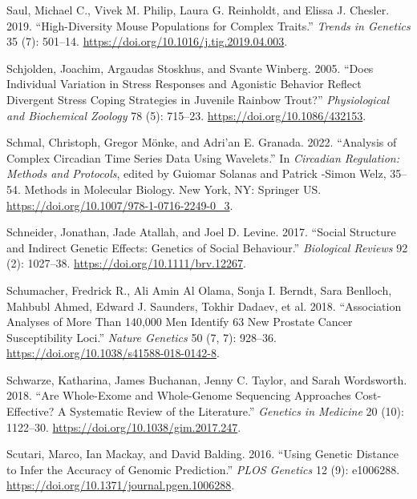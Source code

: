 \documentclass[
]{book}
\newlength{\cslhangindent}
\newlength{\cslentryspacingunit} %
\newenvironment{CSLReferences}[2] %
 {%
  \setlength{\parindent}{0pt}
  \ifodd #1
  \let\oldpar\par
  \def\par{\hangindent=\cslhangindent\oldpar}
  \fi
  \setlength{\parskip}{#2\cslentryspacingunit}
 }%
 {}
\begin{document}
\begin{CSLReferences}{1}{0}
\leavevmode{}%
Saul, Michael C., Vivek M. Philip, Laura G. Reinholdt, and Elissa J. Chesler. 2019. {``High-{Diversity Mouse Populations} for {Complex Traits}.''} \emph{Trends in Genetics} 35 (7): 501--14. \url{https://doi.org/10.1016/j.tig.2019.04.003}.

\leavevmode{}%
Schjolden, Joachim, Argaudas Stoskhus, and Svante Winberg. 2005. {``Does {Individual Variation} in {Stress Responses} and {Agonistic Behavior Reflect Divergent Stress Coping Strategies} in {Juvenile Rainbow Trout}?''} \emph{Physiological and Biochemical Zoology} 78 (5): 715--23. \url{https://doi.org/10.1086/432153}.

\leavevmode{}%
Schmal, Christoph, Gregor Mönke, and Adri'an E. Granada. 2022. {``Analysis of {Complex Circadian Time Series Data Using Wavelets}.''} In \emph{Circadian {Regulation}: {Methods} and {Protocols}}, edited by Guiomar Solanas and Patrick -Simon Welz, 35--54. Methods in {Molecular Biology}. {New York, NY}: {Springer US}. \url{https://doi.org/10.1007/978-1-0716-2249-0_3}.

\leavevmode{}%
Schneider, Jonathan, Jade Atallah, and Joel D. Levine. 2017. {``Social Structure and Indirect Genetic Effects: Genetics of Social Behaviour.''} \emph{Biological Reviews} 92 (2): 1027--38. \url{https://doi.org/10.1111/brv.12267}.

\leavevmode{}%
Schumacher, Fredrick R., Ali Amin Al Olama, Sonja I. Berndt, Sara Benlloch, Mahbubl Ahmed, Edward J. Saunders, Tokhir Dadaev, et al. 2018. {``Association Analyses of More Than 140,000 Men Identify 63 New Prostate Cancer Susceptibility Loci.''} \emph{Nature Genetics} 50 (7, 7): 928--36. \url{https://doi.org/10.1038/s41588-018-0142-8}.

\leavevmode{}%
Schwarze, Katharina, James Buchanan, Jenny C. Taylor, and Sarah Wordsworth. 2018. {``Are Whole-Exome and Whole-Genome Sequencing Approaches Cost-Effective? {A} Systematic Review of the Literature.''} \emph{Genetics in Medicine} 20 (10): 1122--30. \url{https://doi.org/10.1038/gim.2017.247}.

\leavevmode{}%
Scutari, Marco, Ian Mackay, and David Balding. 2016. {``Using {Genetic Distance} to {Infer} the {Accuracy} of {Genomic Prediction}.''} \emph{PLOS Genetics} 12 (9): e1006288. \url{https://doi.org/10.1371/journal.pgen.1006288}.


\end{CSLReferences}
\end{document}
